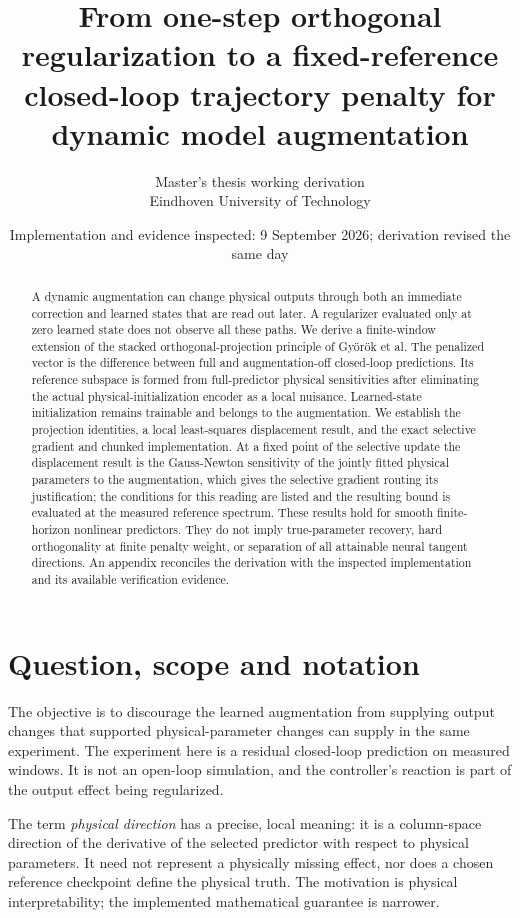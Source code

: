 \documentclass[11pt,a4paper]{article}
\title{From one-step orthogonal regularization to a\newline
fixed-reference closed-loop trajectory penalty\newline
for dynamic model augmentation}
\author{Master's thesis working derivation\\Eindhoven University of Technology}
\date{Implementation and evidence inspected: 9 September 2026; derivation revised the same day}
\theoremstyle{remark}
\begin{document}
\maketitle
\begin{abstract}
A dynamic augmentation can change physical outputs through both an immediate correction and learned states that are read out later. A regularizer evaluated only at zero learned state does not observe all these paths. We derive a finite-window extension of the stacked orthogonal-projection principle of Gy\"or\"ok et al. The penalized vector is the difference between full and augmentation-off closed-loop predictions. Its reference subspace is formed from full-predictor physical sensitivities after eliminating the actual physical-initialization encoder as a local nuisance. Learned-state initialization remains trainable and belongs to the augmentation. We establish the projection identities, a local least-squares displacement result, and the exact selective gradient and chunked implementation. At a fixed point of the selective update the displacement result is the Gauss-Newton sensitivity of the jointly fitted physical parameters to the augmentation, which gives the selective gradient routing its justification; the conditions for this reading are listed and the resulting bound is evaluated at the measured reference spectrum. These results hold for smooth finite-horizon nonlinear predictors. They do not imply true-parameter recovery, hard orthogonality at finite penalty weight, or separation of all attainable neural tangent directions. An appendix reconciles the derivation with the inspected implementation and its available verification evidence.
\end{abstract}
\tableofcontents

\section{Question, scope and notation}
The objective is to discourage the learned augmentation from supplying output changes that supported physical-parameter changes can supply in the same experiment. The experiment here is a residual closed-loop prediction on measured windows. It is not an open-loop simulation, and the controller's reaction is part of the output effect being regularized.

The term \emph{physical direction} has a precise, local meaning: it is a column-space direction of the derivative of the selected predictor with respect to physical parameters. It need not represent a physically missing effect, nor does a chosen reference checkpoint define the physical truth. The motivation is physical interpretability; the implemented mathematical guarantee is narrower.
\end{document}
